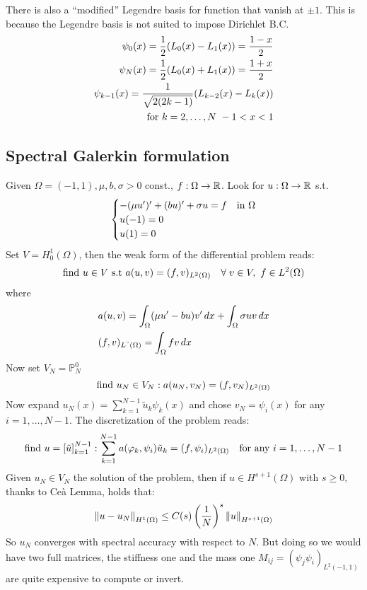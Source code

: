 There is also a ``modified'' Legendre basis for function that vanish at \(\pm 1\). This is because the Legendre basis is not suited to impose Dirichlet B.C.
\begin{align}
    \psi_0(x) = \frac{1}{2} (L_0(x) - L_1(x)) = \frac{1-x}{2} \\ 
    \psi_N(x) = \frac{1}{2} (L_0(x) + L_1(x)) = \frac{1+x}{2} \\ 
    \psi_{k-1}(x) = \frac{1}{\sqrt{2(2k-1)}} (L_{k-2}(x) - L_k(x))\\ 
    \text{for } k = 2, \ldots, N \ -1 < x < 1 \\ 
\end{align}

\subsection{Spectral Galerkin formulation}
Given \(\Omega = (-1, 1), \mu, b, \sigma > 0\) const., \(f: \Omega \to \mathbb{R}\). Look for \(u:\Omega \to \mathbb{R}\) s.t. 
\[
    \begin{cases}
        -(\mu u')'+(bu)' + \sigma u = f & \text{in } \Omega \\
        u(-1) = 0 \\
        u(1) = 0
    \end{cases}
\]
Set \(V  = H^1_0(\Omega)\), then the weak form of the differential problem reads: 
\[
    \text{find } u \in V \text{ s.t } a(u,v) = (f,v)_{L^2(\Omega)} \quad \forall \; v \in V, \ f \in L^2(\Omega)
\]
where 
\begin{align*}
    & a(u,v) = \int_{\Omega} (\mu u' - bu)v'\, dx + \int_{\Omega} \sigma uv \, dx \\
    & (f,v)_{L^"(\Omega)} = \int_{\Omega} f v \, dx
\end{align*}
Now set \(V_N = \mathbb{P}^0_N\) 
\begin{equation}
    \text{find } u_N \in V_N: a(u_N, v_N) = (f, v_N)_{L^2(\Omega)} \label{weak_spec_galerkin_formulation}
\end{equation}
Now expand \(u_N(x) = \sum_{k=1}^{N-1} \tilde{u}_k \psi_k(x)\) and chose \(v_N = \psi_i(x)\) for any \(i = 1, \ldots, N-1\).
The discretization of the problem reads:
\[
    \text{find } u = \left[\tilde{u}\right]_{k=1}^{N-1} : \sum_{k=1}^{N-1} a(\varphi_k, \psi_i)\tilde{u}_k = (f, \psi_i)_{L^2(\Omega)} \quad \text{for any } i = 1, \ldots, N-1
\]
Given \(u_N \in V_N\) the solution of the problem, then if \(u \in H^{s+1}(\Omega)\) with \(s \geq 0\), thanks to Ceà Lemma, holds that:
\[
    \norm{u-u_N}_{H^1(\Omega)} \leq C(s)\left(\frac{1}{N}\right)^s\norm{u}_{H^{s+1}(\Omega)}
\]
So \(u_N\) converges with spectral accuracy with respect to \(N\).
But doing so we would have two full matrices, the stiffness one and the mass one  \(M_{ij} = (\psi_j \psi_i)_{L^2(-1,1)}\) are quite expensive to compute or invert.

